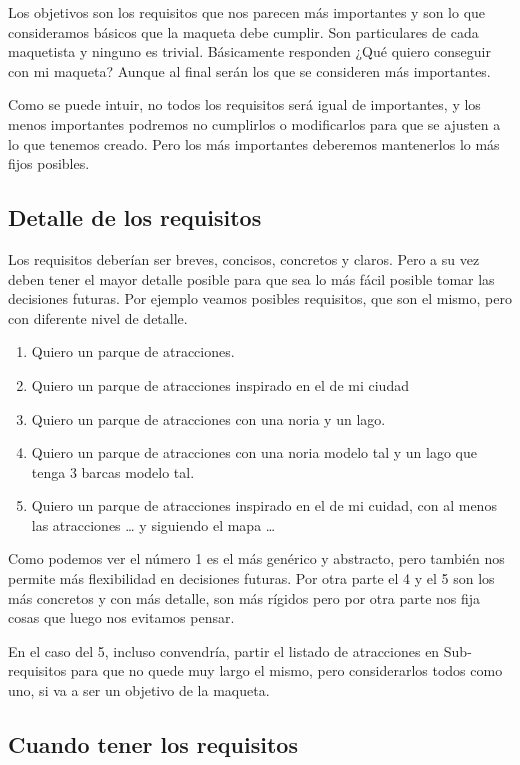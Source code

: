 Los objetivos son los requisitos que nos parecen más importantes y son lo que consideramos básicos que
la maqueta debe cumplir. Son particulares de cada maquetista y ninguno es trivial. Básicamente responden
¿Qué quiero conseguir con mi maqueta? Aunque al final serán los que se consideren más importantes.

Como se puede intuir, no todos los requisitos será igual de importantes, y los menos importantes podremos
no cumplirlos o modificarlos para que se ajusten a lo que tenemos creado. Pero los más importantes deberemos
mantenerlos lo más fijos posibles.

\subsection{Detalle de los requisitos}

Los requisitos deberían ser breves, concisos, concretos y claros. Pero a su vez deben tener el mayor detalle
posible para que sea lo más fácil posible tomar las decisiones futuras. Por ejemplo veamos posibles requisitos,
que son el mismo, pero con diferente nivel de detalle.

\begin{enumerate}
    \item Quiero un parque de atracciones.
    \item Quiero un parque de atracciones inspirado en el de mi ciudad
    \item Quiero un parque de atracciones con una noria y un lago.
    \item Quiero un parque de atracciones con una noria modelo tal y un lago que tenga 3 barcas modelo tal.
    \item Quiero un parque de atracciones inspirado en el de mi cuidad, con al menos las atracciones … y siguiendo el mapa …
\end{enumerate}

Como podemos ver el número 1 es el más genérico y abstracto, pero también nos permite más flexibilidad en
decisiones futuras. Por otra parte el 4 y el 5 son los más concretos y con más detalle, son más rígidos
pero por otra parte nos fija cosas que luego nos evitamos pensar.

En el caso del 5, incluso convendría, partir el listado de atracciones en Sub-requisitos para que no quede muy
largo el mismo, pero considerarlos todos como uno, si va a ser un objetivo de la maqueta.

\subsection{Cuando tener los requisitos}

